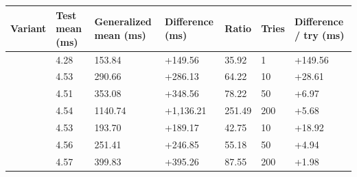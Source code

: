   \begin{tabular}{lllllll}
  \toprule
  Variant & Test mean (ms) & Generalized mean (ms) & Difference (ms) & Ratio & Tries & Difference / try (ms) \\
  \midrule
  \VariantBaseline{} & 4.28 & 153.84 & +149.56 & 35.92 & 1 & +149.56 \\
  \VariantNaiveA{} & 4.53 & 290.66 & +286.13 & 64.22 & 10 & +28.61 \\
  \VariantNaiveB{} & 4.51 & 353.08 & +348.56 & 78.22 & 50 & +6.97 \\
  \VariantNaiveC{} & 4.54 & 1140.74 & +1,136.21 & 251.49 & 200 & +5.68 \\
  \VariantImprovedA{} & 4.53 & 193.70 & +189.17 & 42.75 & 10 & +18.92 \\
  \VariantImprovedB{} & 4.56 & 251.41 & +246.85 & 55.18 & 50 & +4.94 \\
  \VariantImprovedC{} & 4.57 & 399.83 & +395.26 & 87.55 & 200 & +1.98 \\
  \bottomrule
  \end{tabular}
